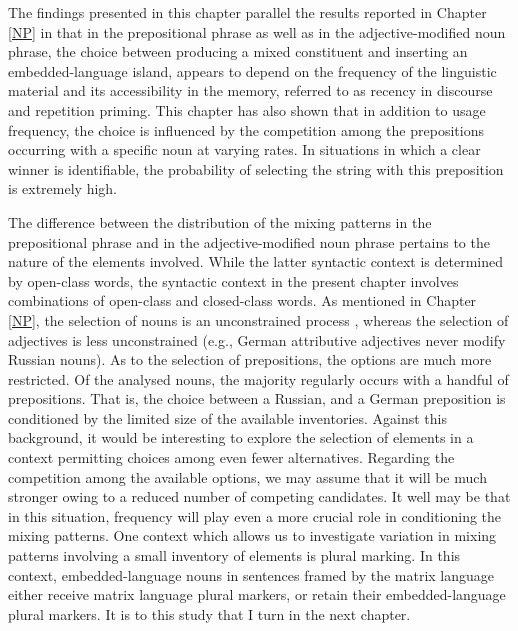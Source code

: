 The findings presented in this chapter parallel the results reported in Chapter \ref{NP} in that in the prepositional phrase as well as in the adjective-modified noun phrase, the choice between producing a mixed constituent and inserting an embedded-language island, appears to depend on the frequency of the linguistic material and its accessibility in the memory, referred to as recency in discourse and repetition priming. This chapter has also shown that in addition to usage frequency, the choice is influenced by the competition among the prepositions occurring with a specific noun at varying rates. In situations in which a clear winner is identifiable, the probability of selecting the string with this preposition is extremely high. 

The difference between the distribution of the mixing patterns in the prepositional phrase and in the adjective-modified noun phrase pertains to the nature of the elements involved. While the latter syntactic context is determined by open-class words, the syntactic context in the present chapter involves combinations of open-class and closed-class words. As mentioned in Chapter \ref{NP}, the selection of nouns is an unconstrained process \citep{boumans-syntax-1998}, whereas the selection of adjectives is less unconstrained (e.g., German attributive adjectives never modify Russian nouns). As to the selection of  prepositions, the options are much more restricted. Of the analysed nouns, the majority regularly occurs with a handful of prepositions. That is, the choice between a Russian, and a German preposition is conditioned by the limited size of the available inventories. Against this background, it would be interesting to explore the selection of elements in a context permitting choices among even fewer alternatives. Regarding the competition among the available options, we may assume that it will be much stronger owing to a reduced number of competing candidates. It well may be that in this situation, frequency will play even a more crucial role in conditioning the mixing patterns. One context which allows us to investigate variation in mixing patterns involving a small inventory of elements is plural marking. In this context, embedded-language nouns in sentences framed by the matrix language either receive  matrix language plural markers, or retain their embedded-language plural markers. It is to this study that I turn in the next chapter.


